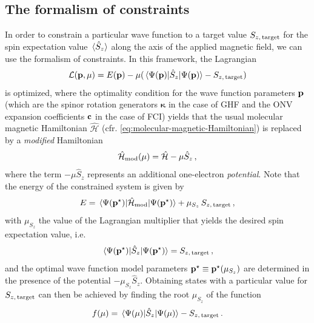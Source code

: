 \documentclass[journal=jctc,manuscript=article]{achemso}
\begin{document}
    \subsection{The formalism of constraints} \label{sec:theory:constraints}
        In order to constrain a particular wave function to a target value $S_{z, \thinspace \text{target}}$ for the spin expectation value $\ev*{\hat{S}_z}$ along the axis of the applied magnetic field, we can use the formalism of constraints.\cite{Mukherji.1963, Zeiss.1983, Zeiss.1983a, DeVriendt.2021}
        In this framework, the Lagrangian
        \begin{equation}
            \mathcal{L}(\vb{p}, \mu)
            = E(\vb{p})
            - \mu ( \ev*{\hat{S}_{z}}{\Psi(\vb{p})} - S_{z, \thinspace \text{target}} )
        \end{equation}
        is optimized, where the optimality condition for the wave function parameters $\vb{p}$ (which are the spinor rotation generators $\boldsymbol{\kappa}$ in the case of GHF and the ONV expansion coefficients $\vb{c}$ in the case of FCI) yields that the usual molecular magnetic Hamiltonian $\hat{\mathcal{H}}$ (cfr. \cref{eq:molecular-magnetic-Hamiltonian}) is replaced by a \emph{modified} Hamiltonian\cite{Lemmens.2021}
        \begin{equation} \label{eq:modified-Hamiltonian}
            \hat{\mathcal{H}}_{\text{mod}}(\mu)
            = \hat{\mathcal{H}}
            - \mu \hat{S}_z
            \thinspace ,
        \end{equation}
        where the term $- \mu \hat{S}_z$ represents an additional one-electron \emph{potential}.\cite{Lemmens.2021}
        Note that the energy of the constrained system is given by
        \begin{equation}
            E
            = \ev*{\hat{\mathcal{H}}_{\text{mod}}}{\Psi(\vb{p}^\star)}
            + \mu_{S_z} \thinspace S_{z, \thinspace \text{target}}
            \thinspace ,
        \end{equation}
        with $\mu_{S_z}$ the value of the Lagrangian multiplier that yields the desired spin expectation value, i.e.
        \begin{equation}\label{eq:spin-expectation-value}
            \ev*{\hat{S}_z}{\Psi(\vb{p}^\star)}
            = S_{z, \thinspace \text{target}}
            \thinspace ,
        \end{equation}
        and the optimal wave function model parameters $\vb{p}^\star \equiv \vb{p}^\star(\mu_{S_z})$ are determined in the presence of the potential $-\mu_{S_z} \hat{S}_z$.
        Obtaining states with a particular value for $S_{z, \thinspace \text{target}}$ can then be achieved by finding the root $\mu_{S_z}$ of the function
        \begin{equation} \label{eq:root-finding-function}
            f(\mu)
            = \ev*{\hat{S}_z}{\Psi(\mu)}
            - S_{z, \thinspace \text{target}}
            \thinspace .
        \end{equation}
\end{document}
